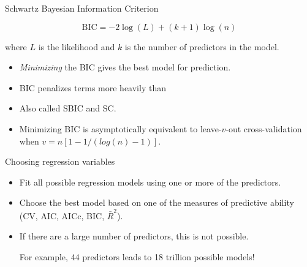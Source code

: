 \documentclass[14pt]{beamer}
\makeatletter
\def\biz{\begin{itemize}[<+-| alert@+>]}
\def\eiz{\end{itemize}}
\makeatother
\begin{document}
\begin{frame}{Schwartz Bayesian Information Criterion}

\begin{block}{}
\[
\text{BIC} = -2\log(L) + (k+1)\log(n)
\]
\end{block}
where $L$ is the likelihood and $k$ is the number of predictors in the model.\pause

\biz
\item \emph{Minimizing} the BIC gives the best model for prediction.

\item BIC penalizes terms more heavily than 

\item Also called SBIC and SC.

\item Minimizing BIC is asymptotically equivalent to leave-$v$-out cross-validation when $v = n[1-1/(log(n)-1)]$.

\eiz

\end{frame}


\begin{frame}{Choosing regression variables}


\biz
\item
Fit all possible regression models using one or more of the predictors.

\item
Choose the best model based on one of the measures of predictive ability (CV, AIC, AICc, BIC, $\bar{R}^2$).
\eiz

\vfill\pause

\begin{itemize}
\item If there are a large number of predictors, this is not possible.

For example, 44 predictors leads to 18 trillion possible models!
\end{itemize}

\end{frame}
\end{document}
